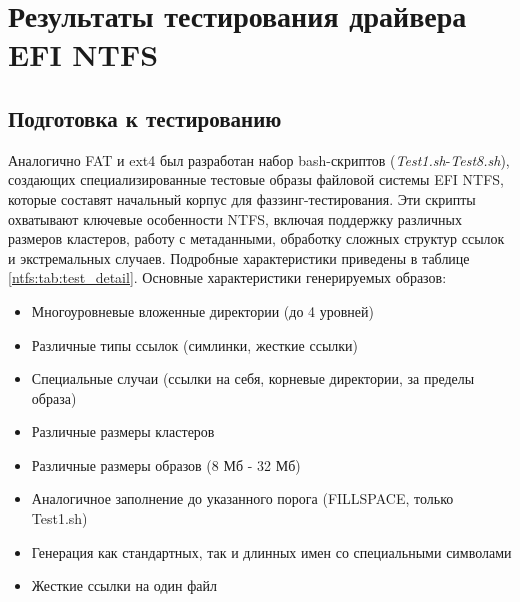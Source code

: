 \section{Результаты тестирования драйвера EFI NTFS}

\subsection{Подготовка к тестированию}
Аналогично FAT и ext4 был разработан набор bash-скриптов (\textit{Test1.sh}-\textit{Test8.sh}), создающих специализированные тестовые образы файловой системы EFI NTFS, которые составят начальный корпус для фаззинг-тестирования. Эти скрипты охватывают ключевые особенности NTFS, включая поддержку различных размеров кластеров, работу с метаданными, обработку сложных структур ссылок и экстремальных случаев. Подробные характеристики приведены в таблице \ref{ntfs:tab:test_detail}. Основные характеристики генерируемых образов:
\begin{itemize}
	\item Многоуровневые вложенные директории (до 4 уровней)
	\item Различные типы ссылок (симлинки, жесткие ссылки)
	\item Специальные случаи (ссылки на себя, корневые директории, за пределы образа)
	\item Различные размеры кластеров
	\item Различные размеры образов (8 Мб - 32 Мб)
	\item Аналогичное заполнение до указанного порога (FILLSPACE, только Test1.sh)
	\item Генерация как стандартных, так и длинных имен со специальными символами
	\item Жесткие ссылки на один файл
\end{itemize} 

